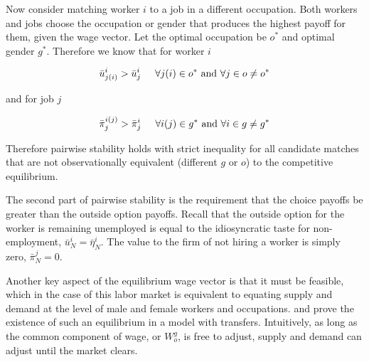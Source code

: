 \documentclass[12pt]{article}
\begin{document}
Now consider matching worker $i$ to a job in a different occupation. Both workers and jobs choose the occupation or gender that produces the highest payoff for them, given the wage vector. Let the optimal occupation be $o^*$ and optimal gender $g^*$. Therefore we know that for worker $i$

$$\bar{u}^{i}_{j(i)} > \bar{u}^{i}_{j} \hspace{5mm} \forall j(i) \in o^* \text{  and  } \forall j \in o \neq o^*$$

and for job $j$

$$\bar{\pi}^{i(j)}_{j} > \bar{\pi}^{i}_j \hspace{5mm} \forall i(j) \in g^* \text{  and  } \forall i \in g \neq g^*$$

Therefore pairwise stability holds with strict inequality for all candidate matches that are not observationally equivalent (different $g$ or $o$) to the competitive equilibrium.

The second part of pairwise stability is the requirement that the choice payoffs be greater than the outside option payoffs. Recall that the outside option for the worker is remaining unemployed is equal to the idiosyncratic taste for non-employment, $ \bar{u}^i_N = \bar{\eta}^i_N$. The value to the firm of not hiring a worker is simply zero, $\bar{\pi}^j_N = 0$.



Another key aspect of the equilibrium wage vector is that it must be feasible, which in the case of this labor market is equivalent to equating supply and demand at the level of male and female workers and occupations.  and  prove the existence of such an equilibrium in a model with transfers. Intuitively, as long as the common component of wage, or $W^g_o$, is free to adjust, supply and demand can adjust until the market clears. 

\end{document}
